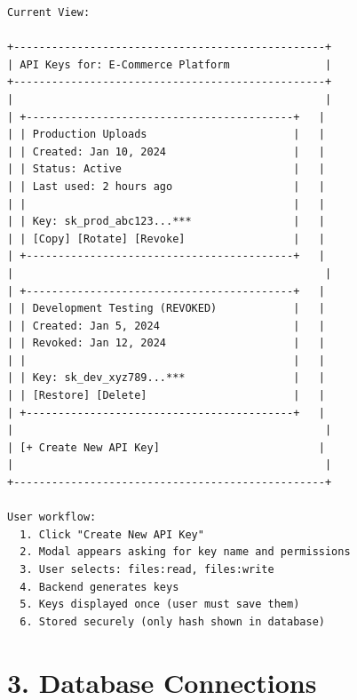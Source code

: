 \documentclass[11pt,a4paper]{report}
\begin{document}
\begin{lstlisting}[language=text]
Current View:

+-------------------------------------------------+
| API Keys for: E-Commerce Platform               |
+-------------------------------------------------+
|                                                 |
| +------------------------------------------+   |
| | Production Uploads                       |   |
| | Created: Jan 10, 2024                    |   |
| | Status: Active                           |   |
| | Last used: 2 hours ago                   |   |
| |                                          |   |
| | Key: sk_prod_abc123...***                |   |
| | [Copy] [Rotate] [Revoke]                 |   |
| +------------------------------------------+   |
|                                                 |
| +------------------------------------------+   |
| | Development Testing (REVOKED)            |   |
| | Created: Jan 5, 2024                     |   |
| | Revoked: Jan 12, 2024                    |   |
| |                                          |   |
| | Key: sk_dev_xyz789...***                 |   |
| | [Restore] [Delete]                       |   |
| +------------------------------------------+   |
|                                                 |
| [+ Create New API Key]                         |
|                                                 |
+-------------------------------------------------+

User workflow:
  1. Click "Create New API Key"
  2. Modal appears asking for key name and permissions
  3. User selects: files:read, files:write
  4. Backend generates keys
  5. Keys displayed once (user must save them)
  6. Stored securely (only hash shown in database)
\end{lstlisting}


\section{3. Database Connections}
\end{document}
